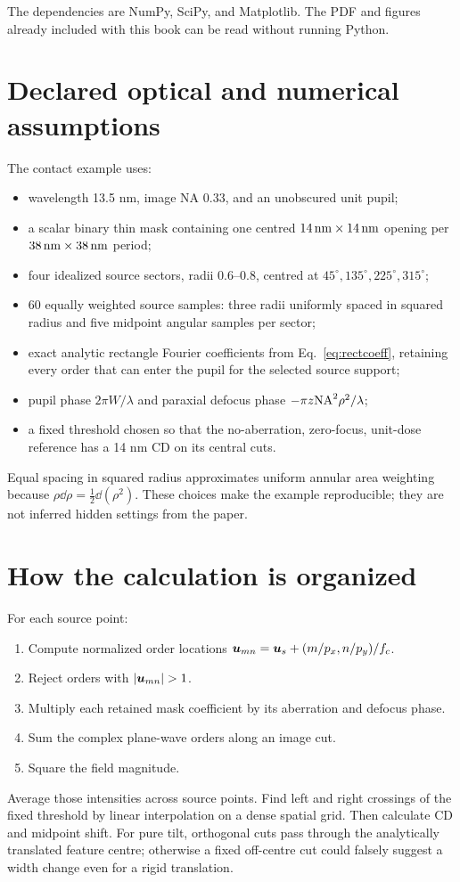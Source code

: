 The dependencies are NumPy, SciPy, and Matplotlib.
The PDF and figures already included with this book can be read without
running Python.

\section{Declared optical and numerical assumptions}
The contact example uses:
\begin{itemize}
\item wavelength 13.5 nm, image NA 0.33, and an unobscured unit pupil;
\item a scalar binary thin mask containing one centred
$14\,\mathrm{nm}\times14\,\mathrm{nm}$ opening per $38\,\mathrm{nm}\times38\,\mathrm{nm}$ period;
\item four idealized source sectors, radii 0.6--0.8, centred at
$45^\circ,135^\circ,225^\circ,315^\circ$;
\item 60 equally weighted source samples: three radii uniformly spaced
in squared radius and five midpoint angular samples per sector;
\item exact analytic rectangle Fourier coefficients from
Eq.~\eqref{eq:rectcoeff}, retaining every order that can enter the pupil
for the selected source support;
\item pupil phase $2\pi W/\lambda$ and paraxial defocus phase
$-\pi z\mathrm{NA}^2\rho^2/\lambda$;
\item a fixed threshold chosen so that the no-aberration, zero-focus,
unit-dose reference has a 14 nm CD on its central cuts.
\end{itemize}
Equal spacing in squared radius approximates uniform annular area
weighting because $\rho\dd\rho=\tfrac12\dd(\rho^2)$.
These choices make the example reproducible; they are not inferred
hidden settings from the paper.

\section{How the calculation is organized}
For each source point:
\begin{enumerate}
\item Compute normalized order locations
$\bm{u}_{mn}=\bm{u}_s+(m/p_x,n/p_y)/f_c$.
\item Reject orders with $|\vct u_{mn}|>1$.
\item Multiply each retained mask coefficient by its aberration and
defocus phase.
\item Sum the complex plane-wave orders along an image cut.
\item Square the field magnitude.
\end{enumerate}
Average those intensities across source points.
Find left and right crossings of the fixed threshold by linear
interpolation on a dense spatial grid.
Then calculate CD and midpoint shift.
For pure tilt, orthogonal cuts pass through the analytically translated
feature centre; otherwise a fixed off-centre cut could falsely suggest
a width change even for a rigid translation.

